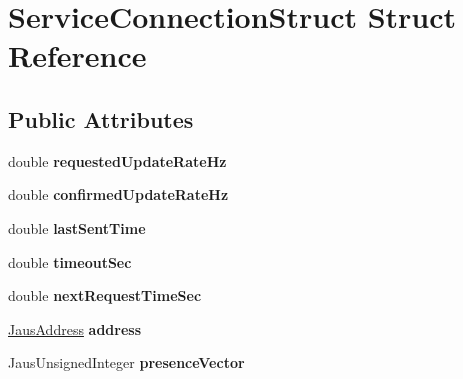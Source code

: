 \hypertarget{struct_service_connection_struct}{\section{\-Service\-Connection\-Struct \-Struct \-Reference}
\label{struct_service_connection_struct}
}
\subsection*{\-Public \-Attributes}
\begin{DoxyCompactItemize}
\item 
\hypertarget{struct_service_connection_struct_a1a4547257a9a78c65d4a8852c91eca5f}{double {\bfseries requested\-Update\-Rate\-Hz}}\label{struct_service_connection_struct_a1a4547257a9a78c65d4a8852c91eca5f}

\item 
\hypertarget{struct_service_connection_struct_a5fe98b524ceaef050161ae7834e3bcaa}{double {\bfseries confirmed\-Update\-Rate\-Hz}}\label{struct_service_connection_struct_a5fe98b524ceaef050161ae7834e3bcaa}

\item 
\hypertarget{struct_service_connection_struct_a51f65ef7223b88ac2397047b7cb846c6}{double {\bfseries last\-Sent\-Time}}\label{struct_service_connection_struct_a51f65ef7223b88ac2397047b7cb846c6}

\item 
\hypertarget{struct_service_connection_struct_ac0319219746b73f1f7984e5233a9b4a6}{double {\bfseries timeout\-Sec}}\label{struct_service_connection_struct_ac0319219746b73f1f7984e5233a9b4a6}

\item 
\hypertarget{struct_service_connection_struct_a465cc3ff7c48356f99a8c75461bd81d8}{double {\bfseries next\-Request\-Time\-Sec}}\label{struct_service_connection_struct_a465cc3ff7c48356f99a8c75461bd81d8}

\item 
\hypertarget{struct_service_connection_struct_a7507cc76da6b51a641e6ab1007e6dcf0}{\hyperlink{struct_jaus_address_struct}{\-Jaus\-Address} {\bfseries address}}\label{struct_service_connection_struct_a7507cc76da6b51a641e6ab1007e6dcf0}

\item 
\hypertarget{struct_service_connection_struct_a51382eac052d52c433cd13fd9c71738e}{\-Jaus\-Unsigned\-Integer {\bfseries presence\-Vector}}\label{struct_service_connection_struct_a51382eac052d52c433cd13fd9c71738e}


\end{DoxyCompactItemize}

